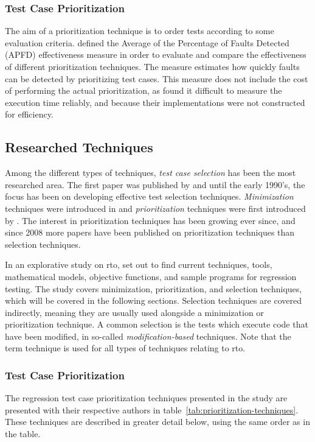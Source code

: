 \documentclass[a4paper,english,12pt]{report}
\begin{document}
\subsubsection{Test Case Prioritization}
The aim of a prioritization technique is to order tests according to some evaluation criteria. \citet[pp. 937-938]{rothermel2001prioritizing} defined the Average of the Percentage of Faults Detected (APFD) effectiveness measure in order to evaluate and compare the effectiveness of different prioritization techniques. The measure estimates how quickly faults can be detected by prioritizing test cases. This measure does not include the cost of performing the actual prioritization, as \citeauthor{rothermel2001prioritizing} found it difficult to measure the execution time reliably, and because their implementations were not constructed for efficiency. \citep[p. 247]{runeson2012regression}

\subsection{Researched Techniques}\label{sec:researched-techniques}
Among the different types of techniques, \textit{test case selection} has been the most researched area. The first paper was published by \citet{fischer1997prioritizing} and until the early 1990's, the focus has been on developing effective test selection techniques. \textit{Minimization} techniques were introduced in \citet{harrold1993metholodgy} and \textit{prioritization} techniques were first introduced by \citet{rothermel1999testcase}. The interest in prioritization techniques has been growing ever since, and since 2008 more papers have been published on prioritization techniques than selection techniques. \citep{runeson2012regression}

In an explorative study on \gls{rto}, \citet{anwar2014exploration} set out to find current techniques, tools, mathematical models, objective functions, and sample programs for regression testing. The study covers minimization, prioritization, and selection techniques, which will be covered in the following sections. Selection techniques are covered indirectly, meaning they are usually used alongside a minimization or prioritization technique. A common selection is the tests which execute code that have been modified, in so-called \textit{modification-based} techniques. Note that the term technique is used for all types of techniques relating to \gls{rto}.

\subsubsection{Test Case Prioritization}
The regression test case prioritization techniques presented in the study are presented with their respective authors in table~\vref{tab:prioritization-techniques}. These techniques are described in greater detail below, using the same order as in the table.
\end{document}
